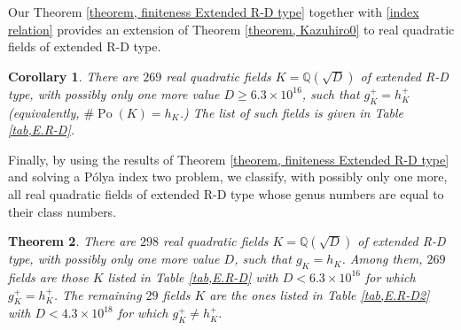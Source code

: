 \documentclass[12pt]{amsart}
\newtheorem{theorem}{Theorem}[section]
\newtheorem{corollary}[theorem]{Corollary}
\theoremstyle{definition}
\numberwithin{equation}{section}
\DeclareMathOperator{\Po}{Po}
\begin{document}
Our Theorem \ref{theorem, finiteness Extended R-D type} together with \eqref{index relation} provides an extension of Theorem \ref{theorem, Kazuhiro0} to real quadratic fields of extended R-D type.


\begin{corollary}
There are $269$ real quadratic fields $K=\mathbb{Q}(\sqrt{D})$ of extended R-D type, with possibly only one more
	value  $D \geq 6.3 \times 10^{16}$, such that $g_K^+=h_K^+$ (equivalently, $\#\Po(K)=h_K$.) The list of such fields is given in Table \ref{tab,E.R-D}.
\end{corollary}

Finally, by using the results of Theorem \ref{theorem, finiteness Extended R-D type} and solving a P\'{o}lya index two problem, we classify, with possibly only one more, all real quadratic fields of extended R-D type whose genus numbers are equal to their class numbers. 
	
\begin{theorem}
\label{theorem, E-R-D real quadratic gK=hK}	
	There are $298$ real quadratic fields $K=\mathbb{Q}(\sqrt{D})$ of extended R-D type, with possibly only one more
	value  $D$, such that $g_K=h_K$. Among them, $269$ fields are those $K$ listed in Table \ref{tab,E.R-D} with $D < 6.3 \times 10^{16}$ for which  $g_K^+=h_K^+$. The remaining $29$ fields $K$ are the ones listed in Table \ref{tab,E.R-D2} with $D < 4.3 \times 10^{18}$ for which $ g_K^+ \neq h_K^+$. 
\end{theorem}
\end{document}
